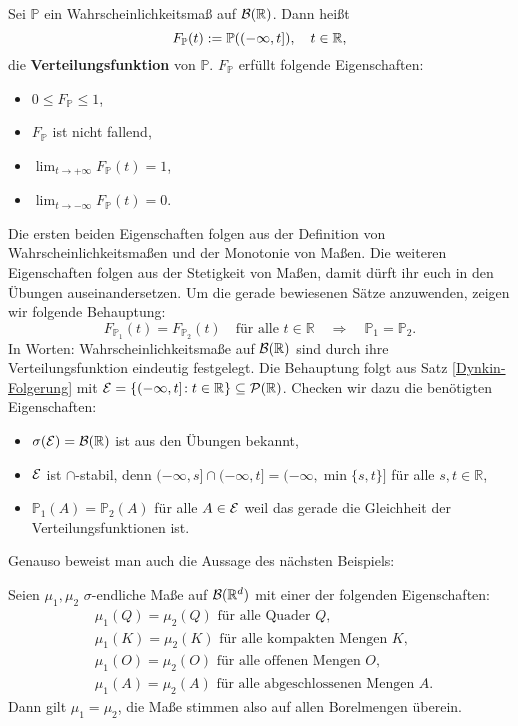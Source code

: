 \begin{beispiel}\label{eindm} 
	Sei $\mathbb P$ ein Wahrscheinlichkeitsma\ss{} auf $\mathcal{B}(\mathbb{R})$. Dann heißt $$F_{\mathbb{P}}(t) := \mathbb{P}((-\infty,t]), \quad t\in \mathbb{R}, $$die \textbf{Verteilungsfunktion} von $\mathbb{P}$. $F_{\mathbb{P}}$ erfüllt folgende Eigenschaften:
	\begin{itemize}
		\item $0 \leq F_{\mathbb{P}} \leq 1$,
		\item $F_{\mathbb{P}}$ ist nicht fallend,
		\item $\lim_{t\to +\infty} F_{\mathbb P}(t)=1$,
		\item $\lim_{t\to -\infty} F_{\mathbb P}(t)=0$.
	\end{itemize}
	Die ersten beiden Eigenschaften folgen aus der Definition von Wahrscheinlichkeitsma\ss en und der Monotonie von Ma\ss en. Die weiteren Eigenschaften folgen aus der Stetigkeit von Ma\ss en, damit d\"urft ihr euch in den \"Ubungen auseinandersetzen. Um die gerade bewiesenen S\"atze anzuwenden, zeigen wir folgende Behauptung: $$F_{\mathbb{P}_1}(t) = F_{\mathbb{P}_2}(t) \quad \text{f\"ur alle } t\in \mathbb{R}\quad \Longrightarrow \quad\mathbb{P}_1 = \mathbb{P}_2.$$ 
In Worten: Wahrscheinlichkeitsma\ss e auf $\mathcal B(\mathbb{R})$ sind durch ihre Verteilungsfunktion eindeutig festgelegt. Die Behauptung folgt aus Satz \ref{Dynkin-Folgerung} mit $\mathcal{E} = \{ (-\infty,t] \! : t\in \mathbb{R} \} \subseteq \mathcal{P}(\mathbb{R})$. Checken wir dazu die ben\"otigten Eigenschaften:
	\begin{itemize}
		\item $\sigma(\mathcal{E}) = \mathcal{B}(\mathbb{R})$ ist aus den \"Ubungen bekannt,
		\item $\mathcal{E}$ ist $\cap$-stabil, denn $(-\infty,s] \cap (-\infty,t] = (-\infty, \min\{ s,t \}]$ f\"ur alle $s,t \in \mathbb{R}$,
		\item $\mathbb{P}_1(A) = \mathbb{P}_2(A)$ f\"ur alle $A \in \mathcal{E}$ weil das gerade die Gleichheit der Verteilungsfunktionen ist.
	\end{itemize}
\end{beispiel}
Genauso beweist man auch die Aussage des n\"achsten Beispiels:
\begin{beispiel} 
	Seien $\mu_1, \mu_2$ $\sigma$-endliche Maße auf $\mathcal{B}(\mathbb{R}^d)$ mit einer der folgenden Eigenschaften:
	\begin{align*}
	&\mu_1(Q) = \mu_2(Q) \text{ für alle Quader } Q,\\
	&\mu_1(K) = \mu_2(K) \text{ für alle kompakten Mengen } K,\\
	&\mu_1(O) = \mu_2(O) \text{ für alle offenen Mengen } O,\\
	&\mu_1(A) = \mu_2(A) \text{ für alle abgeschlossenen Mengen } A.\
	\end{align*}
	Dann gilt $\mu_1 = \mu_2$, die Ma\ss e stimmen also auf allen Borelmengen \"uberein.
\end{beispiel}

